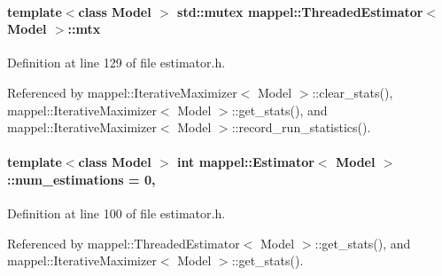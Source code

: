 \paragraph[{\texorpdfstring{mtx}{mtx}}]{\setlength{\rightskip}{0pt plus 5cm}template$<$class Model $>$ std\+::mutex {\bf mappel\+::\+Threaded\+Estimator}$<$ Model $>$\+::mtx\hspace{0.3cm}{\ttfamily [protected]}}\hypertarget{classmappel_1_1ThreadedEstimator_a4538fd0860243430bfd47e8064c8cfe4}{}\label{classmappel_1_1ThreadedEstimator_a4538fd0860243430bfd47e8064c8cfe4}


Definition at line 129 of file estimator.\+h.



Referenced by mappel\+::\+Iterative\+Maximizer$<$ Model $>$\+::clear\+\_\+stats(), mappel\+::\+Iterative\+Maximizer$<$ Model $>$\+::get\+\_\+stats(), and mappel\+::\+Iterative\+Maximizer$<$ Model $>$\+::record\+\_\+run\+\_\+statistics().

\paragraph[{\texorpdfstring{num\+\_\+estimations}{num_estimations}}]{\setlength{\rightskip}{0pt plus 5cm}template$<$class Model $>$ int {\bf mappel\+::\+Estimator}$<$ Model $>$\+::num\+\_\+estimations = 0\hspace{0.3cm}{\ttfamily [protected]}, {\ttfamily [inherited]}}\hypertarget{classmappel_1_1Estimator_ab15b88435d6c50a68fac84465d950b12}{}\label{classmappel_1_1Estimator_ab15b88435d6c50a68fac84465d950b12}


Definition at line 100 of file estimator.\+h.



Referenced by mappel\+::\+Threaded\+Estimator$<$ Model $>$\+::get\+\_\+stats(), and mappel\+::\+Iterative\+Maximizer$<$ Model $>$\+::get\+\_\+stats().

